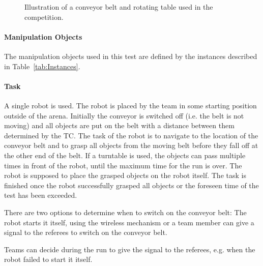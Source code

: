 \begin{figure} [h!]
	\begin{center}
		\hspace{1cm}
	\end{center}
	\caption{Illustration of a conveyor belt and rotating table used in the competition.}
	\label{fig:conveyor_belt}
\end{figure}



\paragraph{Manipulation Objects}
The manipulation objects used in this test are defined by the instances described in Table~\ref{tab:Instances}.

\paragraph{Task}
A single robot is used. The robot is placed by the team in some starting position outside of the arena. Initially the conveyor is switched off (i.e. the belt is not moving) and all objects are put on the belt with a distance between them determined by the TC. The task of the robot is to navigate to the location of the conveyor belt and to grasp all objects from the moving belt before they fall off at the other end of the belt. If a turntable is used, the objects can pass multiple times in front of the robot, until the maximum time for the run is over. The robot is supposed to place the grasped objects on the robot itself. The task is finished once the robot successfully grasped all objects or the foreseen time of the test has been exceeded. 
\par
There are two options to determine when to switch on the conveyor belt:
The robot starts it itself, using the wireless mechanism or a team member can give a signal to the referees to switch on the conveyor belt.
\par
Teams can decide during the run to give the signal to the referees, e.g. when the robot failed to start it itself. 


